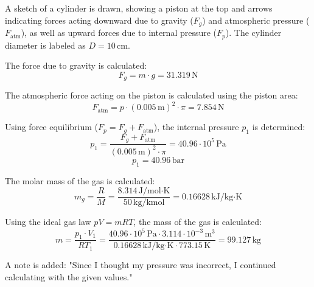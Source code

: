 A sketch of a cylinder is drawn, showing a piston at the top and arrows indicating forces acting downward due to gravity (\( F_g \)) and atmospheric pressure (\( F_{\text{atm}} \)), as well as upward forces due to internal pressure (\( F_p \)). The cylinder diameter is labeled as \( D = 10 \, \text{cm} \).  

The force due to gravity is calculated:  
\[
F_g = m \cdot g = 31.319 \, \text{N}
\]  

The atmospheric force acting on the piston is calculated using the piston area:  
\[
F_{\text{atm}} = p \cdot \left( 0.005 \, \text{m} \right)^2 \cdot \pi = 7.854 \, \text{N}
\]  

Using force equilibrium (\( F_p = F_g + F_{\text{atm}} \)), the internal pressure \( p_1 \) is determined:  
\[
p_1 = \frac{F_g + F_{\text{atm}}}{\left( 0.005 \, \text{m} \right)^2 \cdot \pi} = 40.96 \cdot 10^5 \, \text{Pa}
\]  
\[
p_1 = 40.96 \, \text{bar}
\]  

The molar mass of the gas is calculated:  
\[
m_g = \frac{R}{M} = \frac{8.314 \, \text{J/mol·K}}{50 \, \text{kg/kmol}} = 0.16628 \, \text{kJ/kg·K}
\]  

Using the ideal gas law \( p V = m R T \), the mass of the gas is calculated:  
\[
m = \frac{p_1 \cdot V_1}{R T_1} = \frac{40.96 \cdot 10^5 \, \text{Pa} \cdot 3.114 \cdot 10^{-3} \, \text{m}^3}{0.16628 \, \text{kJ/kg·K} \cdot 773.15 \, \text{K}} = 99.127 \, \text{kg}
\]  

A note is added: "Since I thought my pressure was incorrect, I continued calculating with the given values."